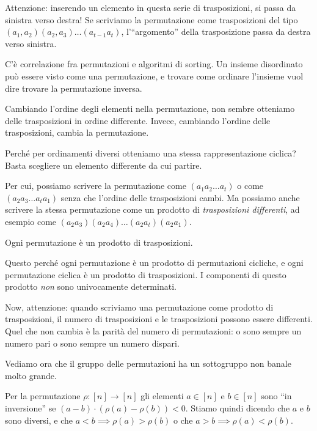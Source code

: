 Attenzione: inserendo un elemento in questa serie di trasposizioni, si passa da sinistra verso destra!
Se scriviamo la permutazione come trasposizioni del tipo $(a_1, a_2) (a_2, a_3) \dots (a_{t-1} a_{t})$, l'``argomento'' della trasposizione passa da destra verso sinistra.

C'\`e correlazione fra permutazioni e algoritmi di sorting.
Un insieme disordinato pu\`o essere visto come una permutazione, e trovare come ordinare l'insieme vuol dire trovare la permutazione inversa.

Cambiando l'ordine degli elementi nella permutazione, non sembre otteniamo delle trasposizioni in ordine differente.
Invece, cambiando l'ordine delle trasposizioni, cambia la permutazione.

Perch\'e per ordinamenti diversi otteniamo una stessa rappresentazione ciclica?
Basta scegliere un elemento differente da cui partire.

Per cui, possiamo scrivere la permutazione come $(a_1 a_2 \dots a_t)$ o come $(a_2 a_3 \dots a_t a_1)$ senza che l'ordine delle trasposizioni cambi.
Ma possiamo anche scrivere la stessa permutazione come un prodotto di \emph{trasposizioni differenti}, ad esempio come $(a_2 a_3) (a_2 a_4) \dots (a_2 a_t) (a_2 a_1)$.

\begin{prop}
	Ogni permutazione \`e un prodotto di trasposizioni.
\end{prop}

Questo perch\'e ogni permutazione \`e un prodotto di permutazioni cicliche, e ogni permutazione ciclica \`e un prodotto di trasposizioni.
I componenti di questo prodotto \emph{non} sono univocamente determinati.

Now, attenzione: quando scriviamo una permutazione come prodotto di trasposizioni, il numero di trasposizioni e le trasposizioni possono essere differenti.
Quel che non cambia \`e la parit\`a del numero di permutazioni: o sono sempre un numero pari o sono sempre un numero dispari.

Vediamo ora che il gruppo delle permutazioni ha un sottogruppo non banale molto grande.

\begin{defn}
	Per la permutazione $\rho : [n] \to [n]$ gli elementi $a \in [n]$ e $b \in [n]$ sono ``in inversione'' se $(a - b) \cdot (\rho(a) - \rho(b)) < 0$.
	Stiamo quindi dicendo che $a$ e $b$ sono diversi, e che $a < b \implies \rho(a) > \rho(b)$ o che $a > b \implies \rho(a) < \rho(b)$.
\end{defn}

